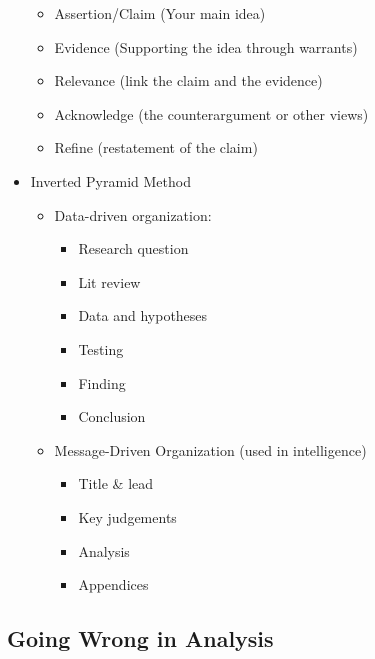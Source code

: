 \documentclass[11pt]{article}
\begin{document}
\begin{itemize}
\begin{itemize}
\item Assertion/Claim (Your main idea)
\item Evidence (Supporting the idea through warrants)
\item Relevance (link the claim and the evidence)
\item Acknowledge (the counterargument or other views)
\item Refine (restatement of the claim)
\end{itemize}
\item Inverted Pyramid Method
\begin{itemize}
\item Data-driven organization:
\begin{itemize}
\item Research question
\item Lit review
\item Data and hypotheses
\item Testing
\item Finding
\item Conclusion
\end{itemize}
\item Message-Driven Organization (used in intelligence)
\begin{itemize}
\item Title \& lead
\item Key judgements
\item Analysis
\item Appendices
\end{itemize}
\end{itemize}
\end{itemize}
\subsection{Going Wrong in Analysis}
\label{sec:org75b47ab}
\end{document}
